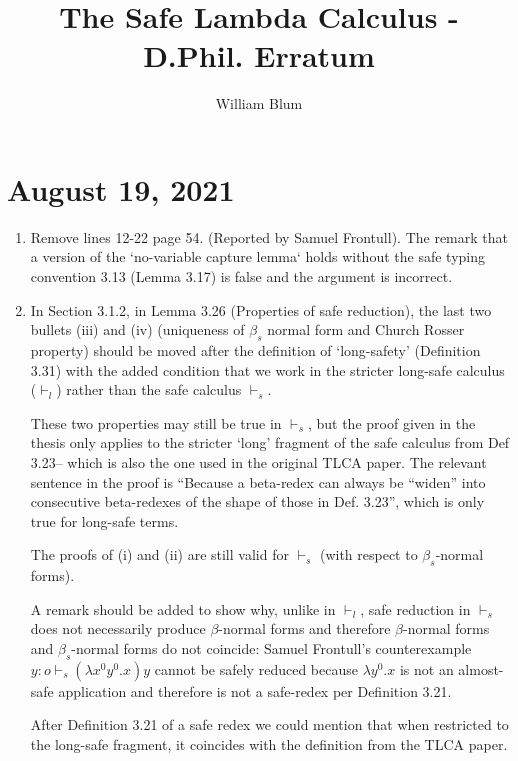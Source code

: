 \documentclass[12pt]{article}
\begin{document}
\title{The Safe Lambda Calculus - D.Phil. Erratum}
\author{William Blum}

\maketitle

\section {August 19, 2021}

\begin{enumerate}
\item Remove lines 12-22 page 54. (Reported by Samuel Frontull).
The remark that a version of the `no-variable capture lemma` holds without the safe typing convention 3.13 (Lemma 3.17) is false and the argument is incorrect.

\item In Section 3.1.2, in Lemma 3.26 (Properties of safe reduction),
the last two bullets (iii) and (iv) (uniqueness of $\beta_s$ normal form and Church Rosser property) should be moved
after the definition of `long-safety' (Definition 3.31) with the added condition that we work in the stricter long-safe calculus ($\vdash_l$)
rather than the safe calculus $\vdash_s$.

These two properties may still be true in $\vdash_s$, but the proof given in the thesis only applies to the stricter `long' fragment of the safe calculus from Def 3.23-- which is also the one used in the original TLCA paper. The relevant sentence in the proof is ``Because a beta-redex can always be “widen” into consecutive beta-redexes of the
shape of those in Def. 3.23'', which is only true for long-safe terms.

The proofs of (i) and (ii) are still valid for $\vdash_s$ (with respect to $\beta_s$-normal forms).

A remark should be added to show why, unlike in $\vdash_l$, safe reduction in $\vdash_s$ does not necessarily produce $\beta$-normal forms and therefore $\beta$-normal forms and $\beta_s$-normal forms do not coincide:
Samuel Frontull's counterexample $y:o \vdash_s (\lambda x^0 y^0 .x) y $ cannot be safely reduced because $ \lambda y^0 .x$ is not an almost-safe application and therefore is not a safe-redex per Definition 3.21.

After Definition 3.21 of a safe redex we could mention that when restricted to  the long-safe fragment, it coincides with the definition from the TLCA paper.


\end{enumerate}
\end{document}
